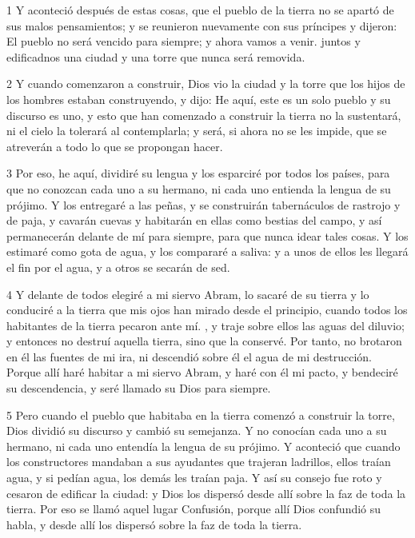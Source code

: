 \par 1 Y aconteció después de estas cosas, que el pueblo de la tierra no se apartó de sus malos pensamientos; y se reunieron nuevamente con sus príncipes y dijeron: El pueblo no será vencido para siempre; y ahora vamos a venir. juntos y edificadnos una ciudad y una torre que nunca será removida.

\par 2 Y cuando comenzaron a construir, Dios vio la ciudad y la torre que los hijos de los hombres estaban construyendo, y dijo: He aquí, este es un solo pueblo y su discurso es uno, y esto que han comenzado a construir la tierra no la sustentará, ni el cielo la tolerará al contemplarla; y será, si ahora no se les impide, que se atreverán a todo lo que se propongan hacer.

\par 3 Por eso, he aquí, dividiré su lengua y los esparciré por todos los países, para que no conozcan cada uno a su hermano, ni cada uno entienda la lengua de su prójimo. Y los entregaré a las peñas, y se construirán tabernáculos de rastrojo y de paja, y cavarán cuevas y habitarán en ellas como bestias del campo, y así permanecerán delante de mí para siempre, para que nunca idear tales cosas. Y los estimaré como gota de agua, y los compararé a saliva: y a unos de ellos les llegará el fin por el agua, y a otros se secarán de sed.

\par 4 Y delante de todos elegiré a mi siervo Abram, lo sacaré de su tierra y lo conduciré a la tierra que mis ojos han mirado desde el principio, cuando todos los habitantes de la tierra pecaron ante mí. , y traje sobre ellos las aguas del diluvio; y entonces no destruí aquella tierra, sino que la conservé. Por tanto, no brotaron en él las fuentes de mi ira, ni descendió sobre él el agua de mi destrucción. Porque allí haré habitar a mi siervo Abram, y haré con él mi pacto, y bendeciré su descendencia, y seré llamado su Dios para siempre.

\par 5 Pero cuando el pueblo que habitaba en la tierra comenzó a construir la torre, Dios dividió su discurso y cambió su semejanza. Y no conocían cada uno a su hermano, ni cada uno entendía la lengua de su prójimo. Y aconteció que cuando los constructores mandaban a sus ayudantes que trajeran ladrillos, ellos traían agua, y si pedían agua, los demás les traían paja. Y así su consejo fue roto y cesaron de edificar la ciudad: y Dios los dispersó desde allí sobre la faz de toda la tierra. Por eso se llamó aquel lugar Confusión, porque allí Dios confundió su habla, y desde allí los dispersó sobre la faz de toda la tierra.

